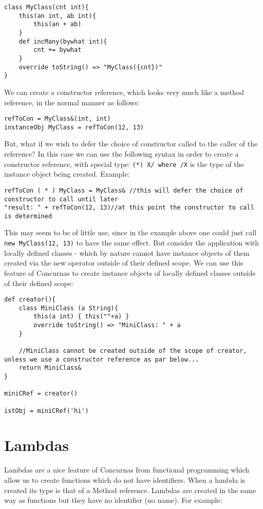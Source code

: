 \documentclass[conc-doc]{subfiles}
\begin{document}
\begin{lstlisting}
class MyClass(cnt int){
	this(an int, ab int){
		this(an + ab)
	}
	def incMany(bywhat int){
		cnt += bywhat
	}
	override toString() => "MyClass({cnt})"
}
\end{lstlisting}

We can create a constructor reference, which looks very much like a method reference, in the normal manner as follows:

\begin{lstlisting}
refToCon = MyClass&(int, int)
instanceObj MyClass = refToCon(12, 13)
\end{lstlisting}

But, what if we wish to defer the choice of constructor called to the caller of the reference? In this case we can use the following syntax in order to create a constructor reference, with special type: \lstinline{(*) X/ where /X} is the type of the instance object being created. Example:

\begin{lstlisting}
refToCon ( * ) MyClass = MyClass& //this will defer the choice of constructor to call until later
"result: " + refToCon(12, 13)//at this point the constructor to call is determined
\end{lstlisting}

This may seem to be of little use, since in the example above one could just call \lstinline{new MyClass(12, 13)} to have the same effect. But consider the application with locally defined classes - which by nature cannot have instance objects of them created via the new operator outside of their defined scope. We can use this feature of Concurnas to create instance objects of locally defined classes outside of their defined scope:

\begin{lstlisting}
def creator(){
	class MiniClass (a String){
		this(a int) { this(""+a) }
		override toString() => "MiniClass: " + a
	}
	
	//MiniClass cannot be created outside of the scope of creator, unless we use a constructor reference as par below...
	return MiniClass&
}

miniCRef = creator()

istObj = miniCRef('hi')
\end{lstlisting}

\section{Lambdas}
Lambdas are a nice feature of Concurnas from functional programming which allow us to create functions which do not have identifiers. When a lambda is created its type is that of a Method reference. Lambdas are created in the same way as functions but they have no identifier (no name). For example:
\end{document}
